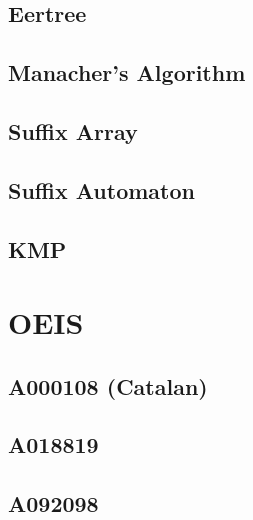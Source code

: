 \subsection{Eertree}

\subsection{Manacher's Algorithm}

\subsection{Suffix Array}

\subsection{Suffix Automaton}

\subsection{KMP}

\section{OEIS}
\subsection{A000108 (Catalan)}

\subsection{A018819}

\subsection{A092098}

